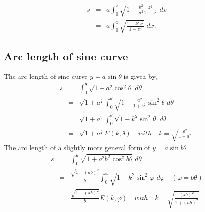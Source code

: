 \documentclass{article}
\begin{document}
\begin{eqnarray}
s &=& a \int_{0}^{z} \sqrt{ 1  +   \frac{b^{2}}{a^{2}} \frac{z^{2}}{1 - z^{2}} } \; dx \\ \nonumber
  &=& a \int_{0}^{z} \sqrt{ \frac{1 -k ^{2} z^{2}}{1 - z^{2}} } \; dx.
\end{eqnarray}
\subsection{Arc length of sine curve}
\label{sec-2-2}
The arc length of sine curve $y = a \sin{\theta}$ is given by,
\begin{eqnarray}
s &=&  \int_{0}^{\theta} \sqrt{ 1  +   a^{2} \cos^{2}{\theta}} \; d\theta \\ \nonumber
  &=& \sqrt{1 +a^{2}} \int_{0}^{\theta} \sqrt{ 1  -   \frac{a^{2}}{1 +a ^{2}} \sin^{2}{\theta}} \; d\theta \\ \nonumber
  &=& \sqrt{1 +a^{2}} \int_{0}^{\theta} \sqrt{ 1  -   k^{2} \sin^{2}{\theta}} \; d\theta \\ \nonumber
  &=& \sqrt{1 +a^{2}} E(k, \theta) \quad with \quad k = \sqrt{\frac{a^{2}}{1+a^{2}}}.
\end{eqnarray}
The arc length of a slightly more general form of $y = a \sin{b \theta}$
\begin{eqnarray}
s &=&  \int_{0}^{\theta} \sqrt{ 1  +   a^{2} b^{2} \cos^{2}{ b \theta}} \; d\theta \\ \nonumber
  &=& \frac{\sqrt{1 +(ab)^{2}}}{b} \int_{0}^{\varphi} \sqrt{ 1  -   k^{2} \sin^{2}{\varphi}} \; d\varphi \quad (\varphi = b\theta) \\ \nonumber
  &=& \frac{\sqrt{1 +(ab)^{2}}}{b} E(k, \varphi) \quad with \quad k = \sqrt{\frac{(ab)^{2}}{1+(ab)^{2}}}
\end{eqnarray}
\end{document}
